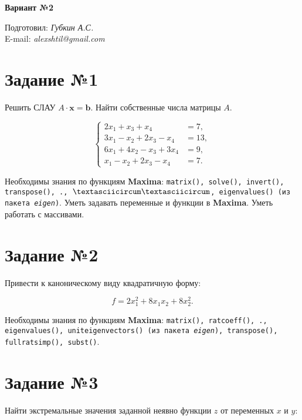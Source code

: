 \begin{center}
    \textbf{\huge Вариант №2}
\end{center}

\begin{flushright}
    Подготовил: \textit{Губкин А.С.}\\
    E-mail: \textit{alexshtil@gmail.com}\\
\end{flushright}

\section*{Задание №1}

    Решить СЛАУ $A \cdot \mathbf{x} = \mathbf{b}$. Найти собственные числа матрицы $A$.

    \[
        \left\{
            \begin{aligned}
                2 x_{1} + x_{3} + x_{4} &= 7,\\
                3 x_{1} - x_{2} + 2 x_{3} - x_{4} &= 13,\\
                6 x_{1} + 4 x_{2} - x_{3} + 3 x_{4} &= 9,\\
                x_{1} - x_{2} + 2 x_{3} - x_{4} &= 7.
            \end{aligned}
        \right.
    \]

    Необходимы знания по функциям \textbf{Maxima}: {\tt matrix(), solve(), invert(), transpose(), ., $\textasciicircum \textasciicircum$, eigenvalues() (из пакета \textit{eigen})}. Уметь задавать переменные и функции в \textbf{Maxima}. Уметь работать с массивами.

\section*{Задание №2}

    Привести к каноническому виду квадратичную форму: 

    \[
        f = 2 x^{2}_{1} + 8 x_{1} x_{2} + 8 x^{2}_{2}.
    \]

    Необходимы знания по функциям \textbf{Maxima}: {\tt matrix(), ratcoeff(), ., eigenvalues(), uniteigenvectors() (из пакета \textit{eigen}), transpose(), fullratsimp(), subst()}.

\section*{Задание №3}

    Найти экстремальные значения заданной неявно функции $z$ от переменных $x$ и $y$:

